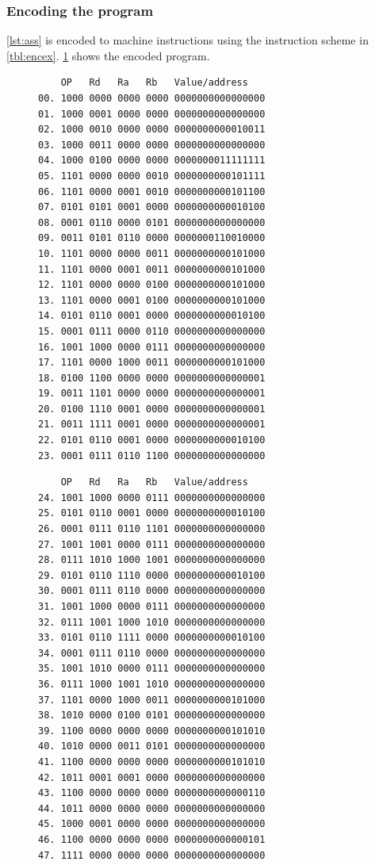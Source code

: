 \documentclass[a4paper, english]{article}
\numberwithin{equation}{section}
\begin{document}
\subsubsection{Encoding the program}
\cref{lst:ass} is encoded to machine instructions using the instruction scheme in \cref{tbl:encex}. \cref{lst:machine} shows the encoded program.
\begin{figure}[p]
    \label{lst:machine}
    \begin{minipage}{0.49\textwidth}
        \vspace{1.5em}
        \centering
        \begin{verbatim}
    OP   Rd   Ra   Rb   Value/address
00. 1000 0000 0000 0000 0000000000000000
01. 1000 0001 0000 0000 0000000000000000
02. 1000 0010 0000 0000 0000000000010011
03. 1000 0011 0000 0000 0000000000000000
04. 1000 0100 0000 0000 0000000011111111
05. 1101 0000 0000 0010 0000000000101111
06. 1101 0000 0001 0010 0000000000101100
07. 0101 0101 0001 0000 0000000000010100
08. 0001 0110 0000 0101 0000000000000000
09. 0011 0101 0110 0000 0000000110010000
10. 1101 0000 0000 0011 0000000000101000
11. 1101 0000 0001 0011 0000000000101000
12. 1101 0000 0000 0100 0000000000101000
13. 1101 0000 0001 0100 0000000000101000
14. 0101 0110 0001 0000 0000000000010100
15. 0001 0111 0000 0110 0000000000000000
16. 1001 1000 0000 0111 0000000000000000
17. 1101 0000 1000 0011 0000000000101000
18. 0100 1100 0000 0000 0000000000000001
19. 0011 1101 0000 0000 0000000000000001
20. 0100 1110 0001 0000 0000000000000001
21. 0011 1111 0001 0000 0000000000000001
22. 0101 0110 0001 0000 0000000000010100
23. 0001 0111 0110 1100 0000000000000000
    \end{verbatim}
    \end{minipage}
    \begin{minipage}{0.49\textwidth}
        \vspace{1.5em}
        \centering
        \begin{verbatim}
    OP   Rd   Ra   Rb   Value/address
24. 1001 1000 0000 0111 0000000000000000
25. 0101 0110 0001 0000 0000000000010100
26. 0001 0111 0110 1101 0000000000000000
27. 1001 1001 0000 0111 0000000000000000
28. 0111 1010 1000 1001 0000000000000000
29. 0101 0110 1110 0000 0000000000010100
30. 0001 0111 0110 0000 0000000000000000
31. 1001 1000 0000 0111 0000000000000000
32. 0111 1001 1000 1010 0000000000000000
33. 0101 0110 1111 0000 0000000000010100
34. 0001 0111 0110 0000 0000000000000000
35. 1001 1010 0000 0111 0000000000000000
36. 0111 1000 1001 1010 0000000000000000
37. 1101 0000 1000 0011 0000000000101000
38. 1010 0000 0100 0101 0000000000000000
39. 1100 0000 0000 0000 0000000000101010
40. 1010 0000 0011 0101 0000000000000000
41. 1100 0000 0000 0000 0000000000101010
42. 1011 0001 0001 0000 0000000000000000
43. 1100 0000 0000 0000 0000000000000110
44. 1011 0000 0000 0000 0000000000000000
45. 1000 0001 0000 0000 0000000000000000
46. 1100 0000 0000 0000 0000000000000101
47. 1111 0000 0000 0000 0000000000000000
     \end{verbatim}
    \end{minipage}
\end{figure}
\end{document}
